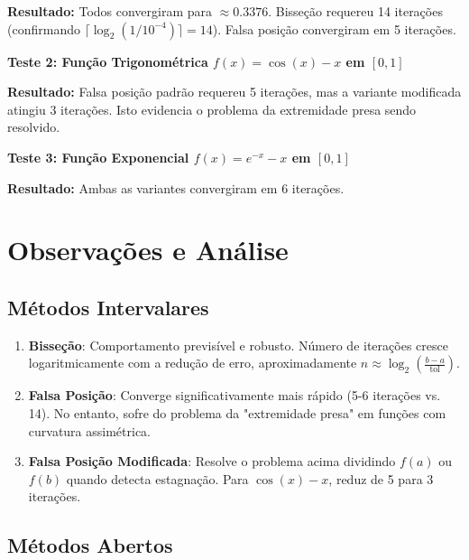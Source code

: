 \documentclass[
	12pt,				%
	openright,			%
	oneside,			%
	a4paper,			%
	english,			%
	brazil				%
	]{abntex2}
\begin{document}
\textbf{Resultado:} Todos convergiram para $\approx 0.3376$. Bisseção requereu 14 iterações (confirmando $\lceil \log_2(1/10^{-4}) \rceil = 14$). Falsa posição convergiram em 5 iterações.

\vspace{0.3cm}

\textbf{Teste 2: Função Trigonométrica $f(x) = \cos(x) - x$ em $[0,1]$}

\textbf{Resultado:} Falsa posição padrão requereu 5 iterações, mas a variante modificada atingiu 3 iterações. Isto evidencia o problema da extremidade presa sendo resolvido.

\vspace{0.3cm}

\textbf{Teste 3: Função Exponencial $f(x) = e^{-x} - x$ em $[0,1]$}

\textbf{Resultado:} Ambas as variantes convergiram em 6 iterações.

\section{Observações e Análise}

\subsection{Métodos Intervalares}

\begin{enumerate}
    \item \textbf{Bisseção}: Comportamento previsível e robusto. Número de iterações cresce logaritmicamente com a redução de erro, aproximadamente $n \approx \log_2\left(\frac{b-a}{\text{tol}}\right)$.
    
    \item \textbf{Falsa Posição}: Converge significativamente mais rápido (5-6 iterações vs. 14). No entanto, sofre do problema da "extremidade presa" em funções com curvatura assimétrica.
    
    \item \textbf{Falsa Posição Modificada}: Resolve o problema acima dividindo $f(a)$ ou $f(b)$ quando detecta estagnação. Para $\cos(x) - x$, reduz de 5 para 3 iterações.
\end{enumerate}

\subsection{Métodos Abertos}
\end{document}
